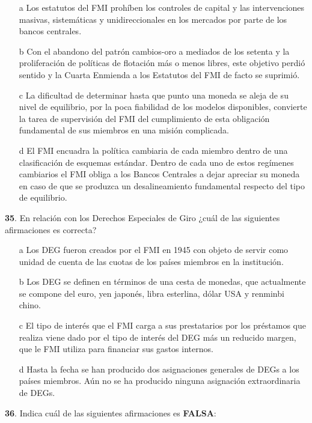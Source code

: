 \documentclass{nuevotema}
\begin{document}
\begin{enumerate}
	\item[a] Los estatutos del FMI prohíben los controles de capital y las intervenciones masivas, sistemáticas y unidireccionales en los mercados por parte de los bancos centrales.
	\item[b] Con el abandono del patrón cambios-oro a mediados de los setenta y la proliferación de políticas de flotación más o menos libres, este objetivo perdió sentido y la Cuarta Enmienda a los Estatutos del FMI de facto se suprimió.
	\item[c] La dificultad de determinar hasta que punto una moneda se aleja de su nivel de equilibrio, por la poca fiabilidad de los modelos disponibles, convierte la tarea de supervisión del FMI del cumplimiento de esta obligación fundamental de sus miembros en una misión complicada.
	\item[d] El FMI encuadra la política cambiaria de cada miembro dentro de una clasificación de esquemas estándar. Dentro de cada uno de estos regímenes cambiarios el FMI obliga a los Bancos Centrales a dejar apreciar su moneda en caso de que se produzca un desalineamiento fundamental respecto del tipo de equilibrio.
\end{enumerate}


\textbf{35}. En relación con los Derechos Especiales de Giro ¿cuál de las siguientes afirmaciones es correcta?

\begin{enumerate}
	\item[a] Los DEG fueron creados por el FMI en 1945 con objeto de servir como unidad de cuenta de las cuotas de los países miembros en la institución.
	\item[b] Los DEG se definen en términos de una cesta de monedas, que actualmente se compone del euro, yen japonés, libra esterlina, dólar USA y renminbi chino.
	\item[c] El tipo de interés que el FMI carga a sus prestatarios por los préstamos que realiza viene dado por el tipo de interés del DEG más un reducido margen, que le FMI utiliza para financiar sus gastos internos. 
	\item[d] Hasta la fecha se han producido dos asignaciones generales de DEGs a los países miembros. Aún no se ha producido ninguna asignación extraordinaria de DEGs.
\end{enumerate}

\textbf{36}. Indica cuál de las siguientes afirmaciones es \textbf{FALSA}:
\end{document}
